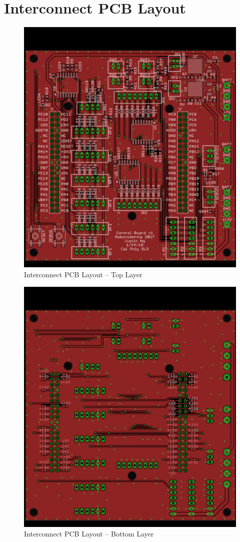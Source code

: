 \chapter{Interconnect PCB Layout}
\label{appendix:layout}
\begin{figure}[H]   %
	\centering \includegraphics[width=6in, keepaspectratio]{figures/pcb_layout_top.png}
	\caption{Interconnect PCB Layout -- Top Layer}\label{fig:pcb_layout_top}
\end{figure}
\begin{figure}[H]   %
	\centering \includegraphics[width=6in, keepaspectratio]{figures/pcb_layout_bot.png}
	\caption{Interconnect PCB Layout -- Bottom Layer}\label{fig:pcb_layout_bot}
\end{figure}